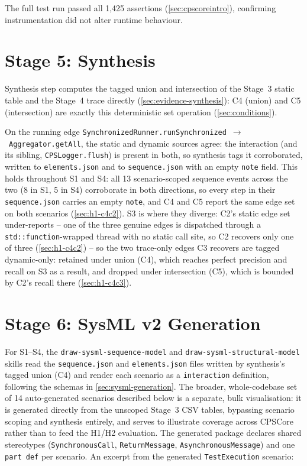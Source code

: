 The full test run passed all 1,425 assertions (\cref{sec:cpscoreintro}),
confirming instrumentation did not alter runtime behaviour.

\section{Stage 5: Synthesis}\label{sec:synthesis-impl}

Synthesis step computes the tagged union and intersection of the Stage~3
static table and the Stage~4 trace directly (\cref{sec:evidence-synthesis}):
C4 (union) and C5 (intersection) are exactly this deterministic set
operation (\cref{sec:conditions}).

On the running edge
\texttt{SynchronizedRunner.runSynchronized}~$\to$~\texttt{Aggregator.getAll},
the static and dynamic sources agree: the interaction (and its sibling,
\texttt{CPSLogger.flush}) is present in both, so synthesis tags it
corroborated, written to \texttt{elements.json} and to
\texttt{sequence.json} with an empty \texttt{note} field. This holds
throughout S1 and S4: all 13 scenario-scoped sequence events across the
two (8 in S1, 5 in S4) corroborate in both directions, so every step in
their \texttt{sequence.json} carries an empty \texttt{note}, and C4 and
C5 report the same edge set on both scenarios (\cref{sec:h1-c4c2}). S3 is
where they diverge: C2's static edge set under-reports -- one of the
three genuine edges is dispatched through a \texttt{std::function}-wrapped
thread with no static call site, so C2 recovers only one of three
(\cref{sec:h1-c4c2}) -- so the two trace-only edges C3 recovers are
tagged dynamic-only: retained under union (C4), which reaches perfect
precision and recall on S3 as a result, and dropped under intersection
(C5), which is bounded by C2's recall there (\cref{sec:h1-c4c3}).

\section{Stage 6: SysML v2 Generation}\label{sec:sysml-impl}

For S1--S4, the \texttt{draw-sysml-sequence-model} and
\texttt{draw-sysml-structural-model} skills read the \texttt{sequence.json}
and \texttt{elements.json} files written by synthesis's tagged union (C4)
and render each scenario as a \sysml \texttt{interaction} definition,
following the schemas in \cref{sec:sysml-generation}. The broader,
whole-codebase set of 14 auto-generated scenarios described below is a
separate, bulk visualisation: it is generated directly from the unscoped
Stage~3 CSV tables, bypassing scenario scoping and synthesis entirely,
and serves to illustrate coverage across CPSCore rather than to feed the
H1/H2 evaluation. The generated package declares shared stereotypes
(\texttt{SynchronousCall}, \texttt{ReturnMessage},
\texttt{AsynchronousMessage}) and one \texttt{part def} per scenario. An
excerpt from the generated \texttt{TestExecution} scenario:


